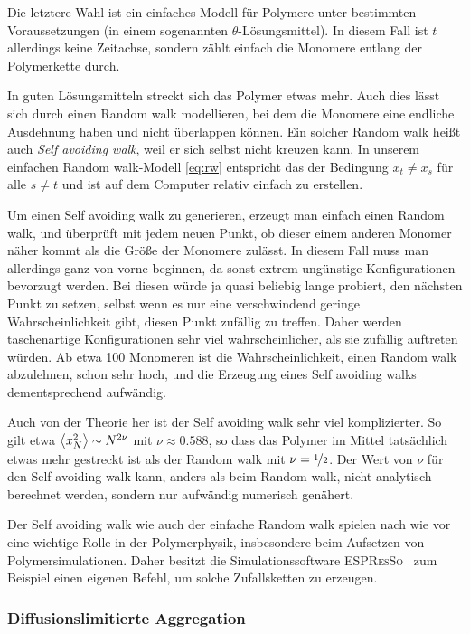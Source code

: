 Die letztere Wahl ist ein einfaches Modell für Polymere unter
bestimmten Voraussetzungen (in einem sogenannten
$\theta$-Lösungsmittel).  In diesem Fall ist $t$ allerdings keine
Zeitachse, sondern zählt einfach die Monomere entlang der Polymerkette
durch.

In guten Lösungsmitteln streckt sich das Polymer etwas mehr. Auch dies
lässt sich durch einen Random walk modellieren, bei dem die Monomere
eine endliche Ausdehnung haben und nicht überlappen können. Ein
solcher Random walk heißt auch \emph{Self avoiding walk}, weil er sich
selbst nicht kreuzen kann. In unserem einfachen Random walk-Modell
\eqref{eq:rw} entspricht das der Bedingung $x_t\neq x_s$ für alle
$s\neq t$ und ist auf dem Computer relativ einfach zu erstellen.

Um einen Self avoiding walk zu generieren, erzeugt man einfach einen
Random walk, und überprüft mit jedem neuen Punkt, ob dieser einem
anderen Monomer näher kommt als die Größe der Monomere zulässt. In
diesem Fall muss man allerdings ganz von vorne beginnen, da sonst
extrem ungünstige Konfigurationen bevorzugt werden. Bei diesen würde
ja quasi beliebig lange probiert, den nächsten Punkt zu setzen, selbst
wenn es nur eine verschwindend geringe Wahrscheinlichkeit gibt, diesen
Punkt zufällig zu treffen. Daher werden taschenartige Konfigurationen
sehr viel wahrscheinlicher, als sie zufällig auftreten würden. Ab etwa
100 Monomeren ist die Wahrscheinlichkeit, einen Random walk
abzulehnen, schon sehr hoch, und die Erzeugung eines Self avoiding
walks dementsprechend aufwändig.

Auch von der Theorie her ist der Self avoiding walk sehr viel
komplizierter. So gilt etwa $\left\langle{x_N^2}\right\rangle \sim N^{2\nu}$ mit
$\nu\approx 0.588$, so dass das Polymer im Mittel tatsächlich etwas
mehr gestreckt ist als der Random walk mit $\nu=\nicefrac{1}{2}$. Der
Wert von $\nu$ für den Self avoiding walk kann, anders als beim Random
walk, nicht analytisch berechnet werden, sondern nur aufwändig
numerisch genähert.

Der Self avoiding walk wie auch der einfache Random walk spielen
nach wie vor eine wichtige Rolle in der Polymerphysik, insbesondere
beim Aufsetzen von Polymersimulationen. Daher besitzt die
Simulationssoftware \textsc{ESPResSo}~\cite{espresso} zum Beispiel
einen eigenen Befehl, um solche Zufallsketten zu erzeugen.

\subsubsection{Diffusionslimitierte Aggregation}

